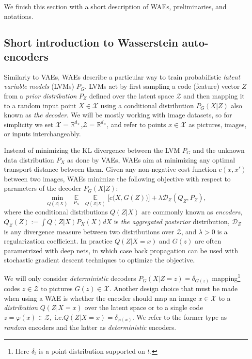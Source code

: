 \documentclass{article}
\def\X{\mathcal{X}}
\def\E{\mathbb{E}}
\def\dZ{d_{\mathcal{Z}}}
\def\dX{d_{\mathcal{X}}}
\def\Z{\mathcal{Z}}
\def\R{\mathbb{R}}
\begin{document}
We finish this section with a short description of WAEs, preliminaries, and notations.
\subsection*{Short introduction to Wasserstein auto-encoders}

Similarly to VAEs, WAEs describe a particular way to train probabilistic \emph{latent variable models} (LVMs) $P_G$.
LVMs act by first sampling a code (feature) vector $Z$ from a \emph{prior distribution} $P_Z$ defined over the latent space $\Z$ and then mapping it to a random input point $X\in\X$ using a conditional distribution $P_G(X|Z)$ also known as \emph{the decoder}.
We will be mostly working with image datasets, so for simplicity we set $\X=\R^{\dX}$,\:$\Z=\R^{\dZ}$, and refer to points $x\in\X$ as pictures, images, or inputs interchangeably.

Instead of minimizing the KL divergence between the LVM $P_G$ and the unknown data distribution $P_X$ as done by VAEs, WAEs aim at minimizing any optimal transport distance between them.
Given any non-negative cost function $c(x,x')$ between two images, WAEs minimize the following objective
with respect to parameters of the decoder $P_G(X|Z)$:
\vspace{-.3cm}
\begin{equation}
\label{eq:WAEobj}
\min_{Q(Z|X)}\; \mathop{\E}\limits_{P_X}\; \mathop{\E}\limits_{Q(Z|X)}\bigl[ c\bigl(X, G(Z)\bigr) \bigr] + \lambda \mathcal{D}_Z(Q_Z, P_Z),
\end{equation}
where the conditional distributions $Q(Z|X)$ are commonly known as \emph{encoders}, 
$Q_Z(Z):= \int Q(Z|X) P_X(X) dX$ is \emph{the aggregated posterior} distribution,
$\mathcal{D}_Z$ is any divergence measure between two distributions over $\Z$, and
$\lambda>0$ is a regularization coefficient.
In practice $Q(Z|X=x)$ and $G(z)$ are often parametrized with deep nets, in which case back propagation can be used with stochastic gradient descent techniques to optimize the objective.

We will only consider \emph{deterministic} decoders ${P_G(X|Z=z)}=\delta_{G(z)}$ mapping\footnote{Here $\delta_t$ is a point distribution supported on $t$.} codes $z\in \Z$ to pictures $G(z)\in \X$.
Another design choice that must be made when using a WAE is whether the encoder should map an image $x\in\mathcal{X}$ to a \emph{distribution} $Q(Z|X=x)$ over the latent space or to a single code $z = \varphi(x)\in\mathcal{Z}$,~i.e.\:$Q(Z|X=x) = \delta_{\varphi(x)}$. We refer to the former type as \emph{random} encoders and the latter as \emph{deterministic} encoders.
\end{document}
